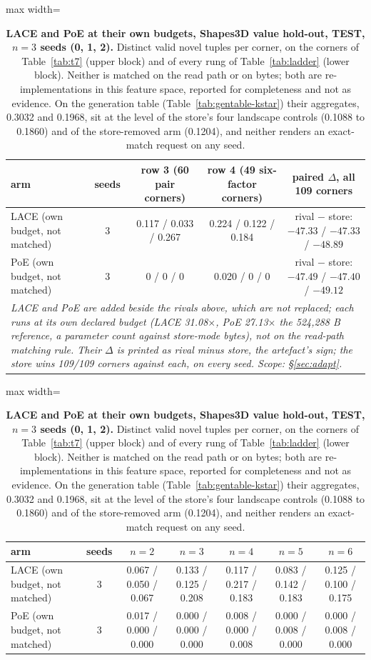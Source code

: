 \documentclass{article} %
\begin{document}
\begin{table}[h]
\centering\scriptsize
\caption{\textbf{LACE and PoE at their own budgets, Shapes3D value hold-out, TEST, $n=3$ seeds (0, 1,
2).} Distinct valid novel tuples per corner, on the corners of Table~\ref{tab:t7} (upper block) and of
every rung of Table~\ref{tab:ladder} (lower block). Neither is matched on the read path or on bytes;
both are re-implementations in this feature space, reported for completeness and not as evidence. On
the generation table (Table~\ref{tab:gentable-kstar}) their aggregates, 0.3032 and 0.1968, sit at the %
level of the store's four landscape controls (0.1088 to 0.1860) and of the store-removed arm %
(0.1204), and neither renders an exact-match request on any seed.} %
\label{tab:lace-poe}
\setlength{\tabcolsep}{2.6pt}
\begin{adjustbox}{max width=\linewidth}\begin{tabular}{lcccc}
\toprule
arm & seeds & row 3 (60 pair corners) & row 4 (49 six-factor corners) & paired $\Delta$, all 109 corners \\ %
\midrule
LACE (own budget, not matched) & 3 & 0.117 / 0.033 / 0.267 & 0.224 / 0.122 / 0.184 & rival $-$ store: $-47.33$ / $-47.33$ / $-48.89$ \\
PoE (own budget, not matched) & 3 & 0 / 0 / 0 & 0.020 / 0 / 0 & rival $-$ store: $-47.49$ / $-47.40$ / $-49.12$ \\
\multicolumn{5}{p{15cm}}{\emph{LACE and PoE are added beside the rivals above, which are not replaced; each runs at its own declared budget (LACE 31.08$\times$, PoE 27.13$\times$ the 524,288 B reference, a parameter count against store-mode bytes), not on the read-path matching rule. Their $\Delta$ is printed as rival minus store, the artefact's sign; the store wins 109/109 corners against each, on every seed. Scope: \S\ref{sec:adapt}.}} \\
\bottomrule
\end{tabular}\end{adjustbox}

\medskip
\begin{adjustbox}{max width=\linewidth}\begin{tabular}{lcccccc}
\toprule
arm & seeds & $n=2$ & $n=3$ & $n=4$ & $n=5$ & $n=6$ \\
\midrule
LACE (own budget, not matched) & 3 & 0.067 / 0.050 / 0.067 & 0.133 / 0.125 / 0.208 & 0.117 / 0.217 / 0.183 & 0.083 / 0.142 / 0.183 & 0.125 / 0.100 / 0.175 \\
PoE (own budget, not matched) & 3 & 0.017 / 0.000 / 0.000 & 0.000 / 0.000 / 0.000 & 0.008 / 0.000 / 0.008 & 0.000 / 0.008 / 0.000 & 0.000 / 0.008 / 0.000 \\
\bottomrule
\end{tabular}\end{adjustbox}
\end{table}
\end{document}
